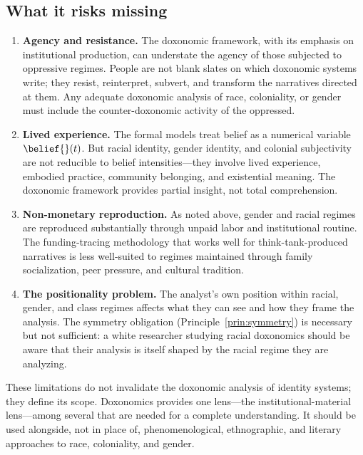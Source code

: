 \subsection{What it risks missing}

\begin{enumerate}
  \item \textbf{Agency and resistance.}
  The doxonomic framework, with its emphasis on institutional production, can understate the agency of those subjected to oppressive regimes.
  People are not blank slates on which doxonomic systems write; they resist, reinterpret, subvert, and transform the narratives directed at them.
  Any adequate doxonomic analysis of race, coloniality, or gender must include the counter-doxonomic activity of the oppressed.

  \item \textbf{Lived experience.}
  The formal models treat belief as a numerical variable $\belief{}(t)$.
  But racial identity, gender identity, and colonial subjectivity are not reducible to belief intensities---they involve lived experience, embodied practice, community belonging, and existential meaning.
  The doxonomic framework provides partial insight, not total comprehension.

  \item \textbf{Non-monetary reproduction.}
  As noted above, gender and racial regimes are reproduced substantially through unpaid labor and institutional routine.
  The funding-tracing methodology that works well for think-tank-produced narratives is less well-suited to regimes maintained through family socialization, peer pressure, and cultural tradition.

  \item \textbf{The positionality problem.}
  The analyst's own position within racial, gender, and class regimes affects what they can see and how they frame the analysis.
  The symmetry obligation (Principle~\ref{prin:symmetry}) is necessary but not sufficient: a white researcher studying racial doxonomics should be aware that their analysis is itself shaped by the racial regime they are analyzing.
\end{enumerate}

These limitations do not invalidate the doxonomic analysis of identity systems; they define its scope.
Doxonomics provides one lens---the institutional-material lens---among several that are needed for a complete understanding.
It should be used alongside, not in place of, phenomenological, ethnographic, and literary approaches to race, coloniality, and gender.

